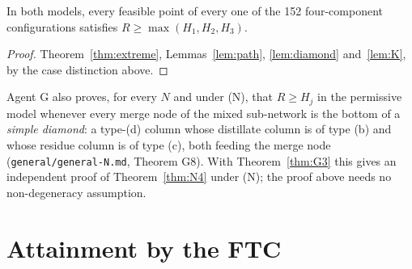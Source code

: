 \documentclass[11pt,a4paper]{report}
\begin{document}
\begin{theorem}[$N=4$]\label{thm:N4}
In both models, every feasible point of every one of the 152 four-component configurations satisfies $R\ge\max(H_1,H_2,H_3)$.
\end{theorem}
\begin{proof}
Theorem~\ref{thm:extreme}, Lemmas~\ref{lem:path}, \ref{lem:diamond} and~\ref{lem:K}, by the case distinction above.
\end{proof}
\noindent Agent G also proves, for every $N$ and under (N), that $R\ge H_j$ in the permissive model whenever every merge
node of the mixed sub-network is the bottom of a \emph{simple diamond}: a type-(d) column whose distillate column is
of type (b) and whose residue column is of type (c), both feeding the merge node (\texttt{general/general-N.md},
Theorem G8). With Theorem~\ref{thm:G3} this gives an independent proof of Theorem~\ref{thm:N4} under (N); the proof above
needs no non-degeneracy assumption.

\section{Attainment by the FTC}\label{sec:achieve}
\end{document}
